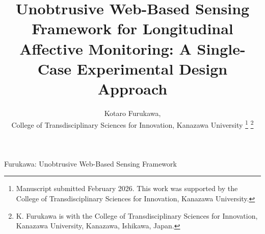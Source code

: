 \documentclass[journal]{IEEEtran}
\begin{document}
\title{Unobtrusive Web-Based Sensing Framework for Longitudinal Affective Monitoring: A Single-Case Experimental Design Approach}

\author{Kotaro Furukawa, \\ College of Transdisciplinary Sciences for Innovation, Kanazawa University%
\thanks{Manuscript submitted February 2026. This work was supported by the College of Transdisciplinary Sciences for Innovation, Kanazawa University.}
\thanks{K. Furukawa is with the College of Transdisciplinary Sciences for Innovation, Kanazawa University, Kanazawa, Ishikawa, Japan.}}

%
{Furukawa: Unobtrusive Web-Based Sensing Framework}

\maketitle












\end{document}
